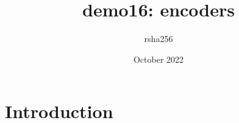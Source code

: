 \documentclass{article}
\title{demo16: encoders}
\author{rsha256 }
\date{October 2022}
\begin{document}
\maketitle

\section{Introduction}
\end{document}
